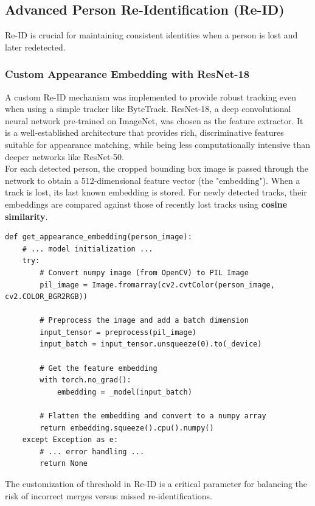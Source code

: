 \documentclass[11pt, a4paper]{article}
\begin{document}
\subsection{Advanced Person Re-Identification (Re-ID)}
Re-ID is crucial for maintaining consistent identities when a person is lost and later redetected.
\subsubsection{Custom Appearance Embedding with ResNet-18}
A custom Re-ID mechanism was implemented to provide robust tracking even when using a simple tracker like ByteTrack. ResNet-18, a deep convolutional neural network pre-trained on ImageNet, was chosen as the feature extractor. It is a well-established architecture that provides rich, discriminative features suitable for appearance matching, while being less computationally intensive than deeper networks like ResNet-50.\\

For each detected person, the cropped bounding box image is passed through the network to obtain a 512-dimensional feature vector (the "embedding"). When a track is lost, its last known embedding is stored. For newly detected tracks, their embeddings are compared against those of recently lost tracks using \textbf{cosine similarity}.\\

\begin{lstlisting}[caption={Core logic for generating appearance embeddings from `reid.py`.}, label={lst:reid}]
def get_appearance_embedding(person_image):
    # ... model initialization ...
    try:
        # Convert numpy image (from OpenCV) to PIL Image
        pil_image = Image.fromarray(cv2.cvtColor(person_image, cv2.COLOR_BGR2RGB))

        # Preprocess the image and add a batch dimension
        input_tensor = preprocess(pil_image)
        input_batch = input_tensor.unsqueeze(0).to(_device)

        # Get the feature embedding
        with torch.no_grad():
            embedding = _model(input_batch)

        # Flatten the embedding and convert to a numpy array
        return embedding.squeeze().cpu().numpy()
    except Exception as e:
        # ... error handling ...
        return None
\end{lstlisting}

The customization of threshold in Re-ID is a critical parameter for balancing the risk of incorrect merges versus missed re-identifications.
\end{document}
